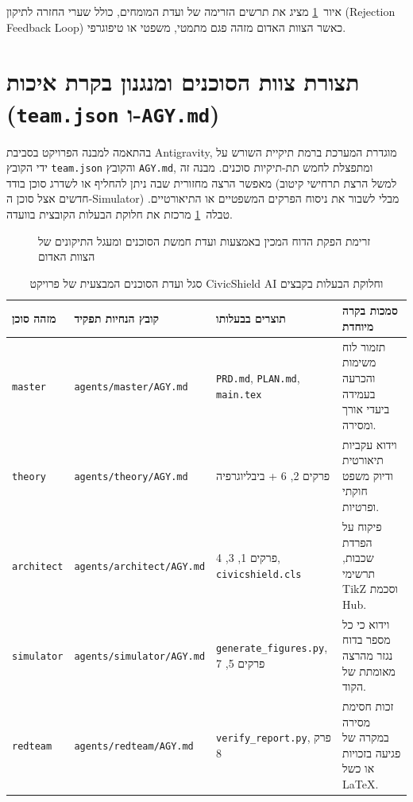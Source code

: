 איור~\ref{fig:workflow} מציג את תרשים הזרימה של ועדת המומחים, כולל שערי החזרה לתיקון (Rejection Feedback Loop) כאשר הצוות האדום מזהה פגם מתמטי, משפטי או טיפוגרפי.

\section{תצורת צוות הסוכנים ומנגנון בקרת איכות (\texttt{team.json} ו-\texttt{AGY.md})}
\label{sec:team-config}

בהתאמה למבנה הפרויקט בסביבת Antigravity, מוגדרת המערכת ברמת תיקיית השורש על ידי הקובץ \texttt{team.json} והקובץ \texttt{AGY.md}, ומתפצלת לחמש תת-תיקיות סוכנים. מבנה זה מאפשר הרצה מחזורית שבה ניתן להחליף או לשדרג סוכן בודד (למשל הרצת תרחישי קיטוב חדשים אצל סוכן ה-Simulator) מבלי לשבור את ניסוח הפרקים המשפטיים או התיאורטיים. טבלה~\ref{tab:agent-committee} מרכזת את חלוקת הבעלות הקובצית בוועדה.

\begin{figure}[htbp]
    \centering
    
    \caption{זרימת הפקת הדוח המכין באמצעות ועדת חמשת הסוכנים ומעגל התיקונים של הצוות האדום}
    \label{fig:workflow}
\end{figure}

\begin{table}[htbp]
    \centering
    \caption{סגל ועדת הסוכנים המבצעית של פרויקט CivicShield AI וחלוקת הבעלות בקבצים}
    \label{tab:agent-committee}
    \begin{tabular}{|p{2.2cm}|p{3.8cm}|p{3.6cm}|p{4.6cm}|}
        \hline
        \textbf{מזהה סוכן} & \textbf{קובץ הנחיות תפקיד} & \textbf{תוצרים בבעלותו} & \textbf{סמכות בקרה מיוחדת} \\
        \hline
        \texttt{master} & \texttt{agents/master/AGY.md} & \texttt{PRD.md}, \texttt{PLAN.md}, \texttt{main.tex} & תזמור לוח משימות והכרעה בעמידה ביעדי אורך ומסירה. \\
        \hline
        \texttt{theory} & \texttt{agents/theory/AGY.md} & פרקים 2, 6 + ביבליוגרפיה & וידוא עקביות תיאורטית ודיוק משפט חוקתי ופרטיות. \\
        \hline
        \texttt{architect} & \texttt{agents/architect/AGY.md} & פרקים 1, 3, 4, \texttt{civicshield.cls} & פיקוח על הפרדת שכבות, תרשימי TikZ וסכמת Hub. \\
        \hline
        \texttt{simulator} & \texttt{agents/simulator/AGY.md} & \texttt{generate\_figures.py}, פרקים 5, 7 & וידוא כי כל מספר בדוח נגזר מהרצה מאומתת של הקוד. \\
        \hline
        \texttt{redteam} & \texttt{agents/redteam/AGY.md} & \texttt{verify\_report.py}, פרק 8 & זכות חסימת מסירה במקרה של פגיעה בזכויות או כשל LaTeX. \\
        \hline
    \end{tabular}
\end{table}

